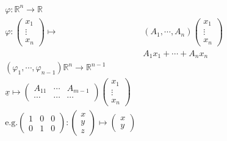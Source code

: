 \documentclass[11pt,a4paper]{report}
\begin{document}
              \begin{align*}
                \varphi: \mathbb{R}^n \rightarrow \mathbb{R}\\
                \varphi: \begin{pmatrix}x_1\\\vdots\\x_n\end{pmatrix} \mapsto &(A_1, \cdots, A_n)\begin{pmatrix}x_1\\\vdots\\x_n\end{pmatrix}\\
                                                             &A_1x_1 + \cdots + A_nx_n\\
                (\varphi_1, \cdots, \varphi_{n-1}) \mathbb{R}^n \rightarrow \mathbb{R}^{n-1}\\
                \underline{x} \mapsto \begin{pmatrix}A_{11} & \cdots & A_{m-1}\\ \cdots&\cdots&\cdots\end{pmatrix}\begin{pmatrix}x_1\\\vdots\\x_n\end{pmatrix}\\
                \textrm{e.g.} \begin{pmatrix}1&0&0\\0&1&0\end{pmatrix}:\begin{pmatrix}x\\y\\z\end{pmatrix} \mapsto \begin{pmatrix}x\\y\end{pmatrix}\\
              \end{align*}
\end{document}
